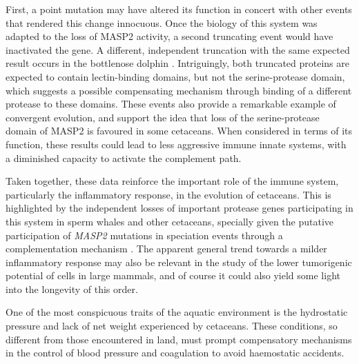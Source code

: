 First, a point mutation may have altered its function in concert with other events that rendered this change innocuous.
Once the biology of this system was adapted to the loss of MASP2 activity, a second truncating event would have inactivated the gene.  
A different, independent truncation with the same expected result occurs in the bottlenose dolphin%
.
Intriguingly, both truncated proteins are expected to contain lectin-binding domains, but not the serine-protease domain, which suggests a possible compensating mechanism through binding of a different protease to these domains.
These events also provide a remarkable example of convergent evolution, and support the idea that loss of the serine-protease domain of MASP2 is favoured in some cetaceans.
When considered in terms of its function, these results could lead to less aggressive immune innate systems, with a diminished capacity to activate the complement path.

Taken together, these data reinforce the important role of the immune system, particularly the inflammatory response, in the evolution of cetaceans.
This is highlighted by the independent losses of important protease genes participating in this system in sperm whales and other cetaceans, specially given the putative participation of \textit{MASP2} mutations in speciation events through a complementation mechanism \cite{Kondrashov2002}.
The apparent general trend towards a milder inflammatory response may also be relevant in the study of the lower tumorigenic potential of cells in large mammals, and of course it could also yield some light into the longevity of this order.

One of the most conspicuous traits of the aquatic environment is the hydrostatic pressure and lack of net weight experienced by cetaceans.
These conditions, so different from those encountered in land, must prompt compensatory mechanisms in the control of blood pressure and coagulation to avoid haemostatic accidents.

